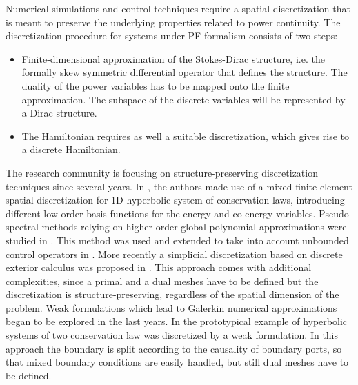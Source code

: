 \documentclass[preprint,12pt]{elsarticle}
\begin{document}
	Numerical simulations and control techniques require a spatial discretization that is meant to preserve the underlying properties related to power continuity. The discretization procedure for systems under PF formalism consists of two steps:
	\begin{itemize}
		\item Finite-dimensional approximation of the Stokes-Dirac structure, i.e. the formally skew symmetric differential operator that defines the structure. The duality of the power variables has to be mapped onto the finite approximation. The subspace of the discrete variables will be represented by a Dirac structure. 
		\item The Hamiltonian requires as well a suitable discretization, which gives rise to a discrete Hamiltonian. 
	\end{itemize} 
	
	The research community is focusing on structure-preserving discretization techniques since several years. In \cite{Golo}, the authors made use of a mixed finite element spatial discretization for 1D hyperbolic system of conservation laws, introducing different low-order basis functions for the energy and co-energy variables. Pseudo-spectral methods relying on higher-order global polynomial approximations were studied in \cite{moulla:hal-01625008}. This method was used and extended to take into account unbounded control operators in \cite{confFlavio}. More recently a simplicial discretization based on discrete exterior calculus was proposed in \cite{SESLIJA20121509}. This approach comes with additional complexities, since a primal and a dual meshes have to be defined but the discretization is structure-preserving, regardless of the spatial dimension of the problem. Weak formulations which lead to Galerkin numerical approximations began to be explored in the last years. In \cite{WeakForm_Kot} the prototypical example of hyperbolic systems of two conservation law was discretized by a weak formulation. In this approach the boundary is split according to the causality of boundary ports, so that mixed boundary conditions are easily handled, but still dual meshes have to be defined.  \\
	
\end{document}
